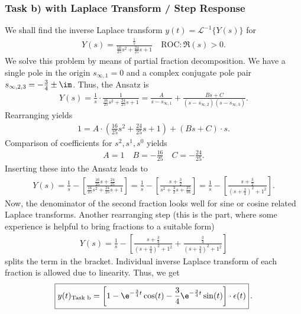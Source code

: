 \subsubsection{Task b) with Laplace Transform / Step Response}
We shall find the inverse Laplace transform $y(t) = \mathcal{L}^{-1}\{Y(s)\}$
for
\begin{align}
Y(s) = \frac{\frac{1}{s}}{\frac{16}{25} s^2 + \frac{24}{25} s + 1}
\quad \text{ROC}: \Re(s) > 0.
\end{align}
%
We solve this problem by means of partial fraction decomposition.
We have a single pole in the origin $s_{\infty,1}=0$ and a complex conjugate
pole pair $s_{\infty,2,3}=-\frac{3}{4}\pm \im$.
Thus, the Ansatz is
\begin{align}
Y(s) = \frac{1}{s}
\cdot \frac{1}{\frac{16}{25} s^2 + \frac{24}{25} s + 1} =
\frac{A}{s-s_{\infty,1}} + \frac{Bs+C}{(s-s_{\infty,2})(s-s_{\infty,3})}.
\end{align}
Rearranging yields
\begin{align}
1 =
A \cdot (\frac{16}{25} s^2 + \frac{24}{25} s + 1) +
(B s + C) \cdot s.
\end{align}
Comparison of coefficients for $s^2, s^1, s^0$ yields
\begin{align}
  A = 1\quad B = -\frac{16}{25} \quad C = -\frac{24}{25}.
\end{align}
Inserting these into the Ansatz leads to
\begin{align}
Y(s) =
\frac{1}{s} - \left[\frac{\frac{16}{25} s + \frac{24}{25}}{\frac{16}{25} s^2 + \frac{24}{25} s + 1}\right]=
\frac{1}{s} - \left[\frac{s + \frac{3}{2}}{s^2 + \frac{3}{2} s + \frac{25}{16}}\right]=
\frac{1}{s} - \left[\frac{s + \frac{3}{2}}{(s + \frac{3}{4})^2 + 1^2}\right].
\end{align}
Now, the denominator of the second fraction looks well for sine or cosine related
Laplace transforms.
Another rearranging step (this is the part, where some experience
is helpful to bring fractions to a suitable form)
\begin{align}
Y(s) =
\frac{1}{s} - \left[\frac{s + \frac{3}{4}}{(s + \frac{3}{4})^2 + 1^2} +
\frac{\frac{3}{4}}{(s+\frac{3}{4})^2 + 1^2}\right]
\end{align}
splits the term in the bracket.
Individual inverse Laplace transform of each fraction is allowed due to
linearity. Thus, we get
\begin{align}
\boxed{y(t)_\text{Task b} =
\left[1
- \e^{-\frac{3}{4} t} \cos(t)
- \frac{3}{4}\e^{-\frac{3}{4} t} \sin(t) \right] \cdot \epsilon(t)}\,.
\end{align}

